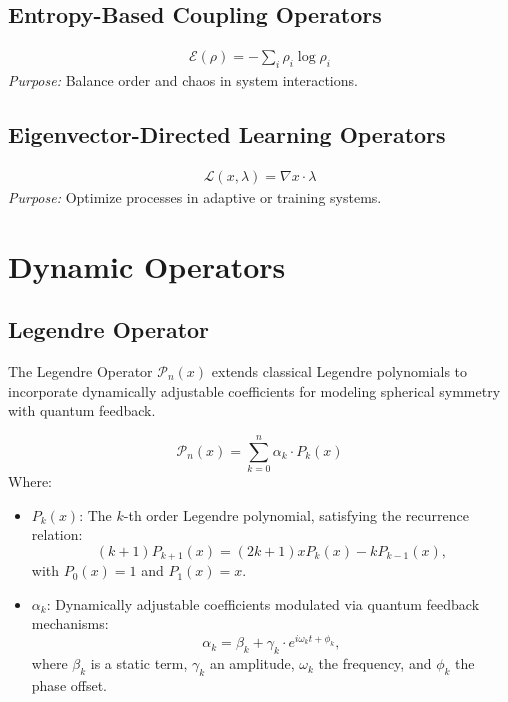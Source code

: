 \documentclass{article}
\theoremstyle{plain}
\begin{document}
\subsection{Entropy-Based Coupling Operators}
    \begin{align}
        \mathcal{E}(\rho) = -\sum_{i} \rho_i \log \rho_i
    \end{align}
    \textit{Purpose:} Balance order and chaos in system interactions.

\subsection{Eigenvector-Directed Learning Operators}
    \begin{align}
        \mathcal{L}(x, \lambda) = \nabla x \cdot \lambda
    \end{align}
    \textit{Purpose:} Optimize processes in adaptive or training systems.

\section{Dynamic Operators}

\subsection{Legendre Operator}

The Legendre Operator \( \mathcal{P}_n(x) \) extends classical Legendre polynomials to incorporate dynamically adjustable coefficients for modeling spherical symmetry with quantum feedback.

\[
\mathcal{P}_n(x) = \sum_{k=0}^n \alpha_k \cdot P_k(x)
\]
Where:
\begin{itemize}
    \item \( P_k(x) \): The \( k \)-th order Legendre polynomial, satisfying the recurrence relation:
    \[
    (k+1) P_{k+1}(x) = (2k+1) x P_k(x) - k P_{k-1}(x),
    \]
    with \( P_0(x) = 1 \) and \( P_1(x) = x \).
    \item \( \alpha_k \): Dynamically adjustable coefficients modulated via quantum feedback mechanisms:
    \[
    \alpha_k = \beta_k + \gamma_k \cdot e^{i \omega_k t + \phi_k},
    \]
    where \( \beta_k \) is a static term, \( \gamma_k \) an amplitude, \( \omega_k \) the frequency, and \( \phi_k \) the phase offset.
\end{itemize}
\end{document}
